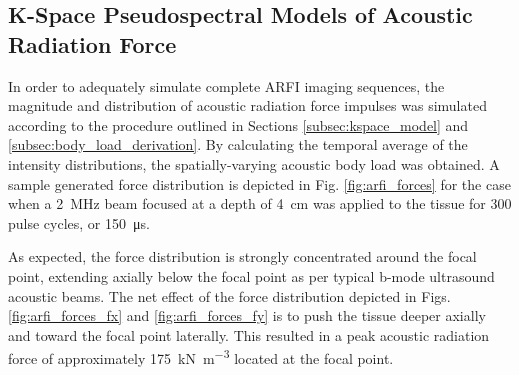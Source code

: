 		\subsection{K-Space Pseudospectral Models of Acoustic Radiation Force}
		\label{subsec:kspace_results}
			In order to adequately simulate complete ARFI imaging sequences, the magnitude and distribution of acoustic radiation force impulses was simulated according to the procedure outlined in Sections \ref{subsec:kspace_model} and \ref{subsec:body_load_derivation}. By calculating the temporal average of the intensity distributions, the spatially-varying acoustic body load was obtained. A sample generated force distribution is depicted in Fig. \ref{fig:arfi_forces} for the case when a \SI{2}{\MHz} beam focused at a depth of \SI{4}{\cm} was applied to the tissue for 300 pulse cycles, or \SI{150}{\us}.

			As expected, the force distribution is strongly concentrated around the focal point, extending axially below the focal point as per typical b-mode ultrasound acoustic beams. The net effect of the force distribution depicted in Figs. \ref{fig:arfi_forces_fx} and \ref{fig:arfi_forces_fy} is to push the tissue deeper axially and toward the focal point laterally. This resulted in a peak acoustic radiation force of approximately \SI{175}{\kN\per\m\cubed} located at the focal point.

